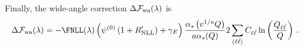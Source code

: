 Finally, the wide-angle correction $\Delta\mathcal{F}_{\rm wa}(\lambda)$ is
 \begin{equation}
 \label{eq:DFwa-general-add}
 	\Delta\mathcal{F}_{\mathrm{wa}}(\lambda)=-\FNLL(\lambda)\left(\psi^{(0)}\left(1+R'_{\mathrm{NLL}}\right)+\gamma_E\right)\frac{\alpha_s\left(v^{1/a}Q\right)}{a\alpha_s(Q)}2\sum_{(\ell\bar\ell)}C_{\ell\bar\ell}\ln\left(\frac{Q_{\ell\bar\ell}}{Q}\right)\,.
 \end{equation}
